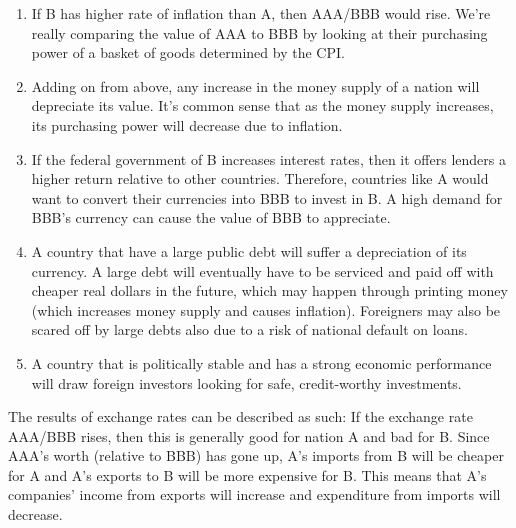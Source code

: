 \documentclass{article}
\begin{document}
    \begin{enumerate}
      \item If B has higher rate of inflation than A, then AAA/BBB would rise. We're really comparing the value of AAA to BBB by looking at their purchasing power of a basket of goods determined by the CPI.
      \item Adding on from above, any increase in the money supply of a nation will depreciate its value. It's common sense that as the money supply increases, its purchasing power will decrease due to inflation.
      \item If the federal government of B increases interest rates, then it offers lenders a higher return relative to other countries. Therefore, countries like A would want to convert their currencies into BBB to invest in B. A high demand for BBB's currency can cause the value of BBB to appreciate.
      \item A country that have a large public debt will suffer a depreciation of its currency. A large debt will eventually have to be serviced and paid off with cheaper real dollars in the future, which may happen through printing money (which increases money supply and causes inflation). Foreigners may also be scared off by large debts also due to a risk of national default on loans.
      \item A country that is politically stable and has a strong economic performance will draw foreign investors looking for safe, credit-worthy investments.
    \end{enumerate}

    The results of exchange rates can be described as such: If the exchange rate AAA/BBB rises, then this is generally good for nation A and bad for B. Since AAA's worth (relative to BBB) has gone up, A's imports from B will be cheaper for A and A's exports to B will be more expensive for B. This means that A's companies' income from exports will increase and expenditure from imports will decrease.
\end{document}
